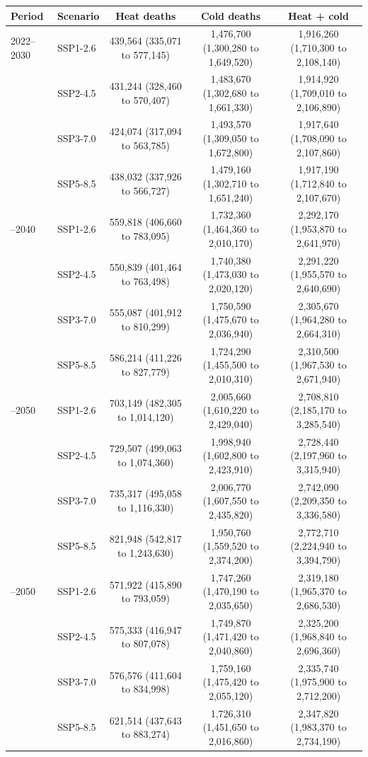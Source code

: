 \begin{tabular}{llccc}
\toprule
Period & Scenario & Heat deaths & Cold deaths & Heat + cold \\
\midrule
2022--2030 & SSP1-2.6 & 439,564 (335,071 to 577,145) & 1,476,700 (1,300,280 to 1,649,520) & 1,916,260 (1,710,300 to 2,108,140) \\
 & SSP2-4.5 & 431,244 (328,460 to 570,407) & 1,483,670 (1,302,680 to 1,661,330) & 1,914,920 (1,709,010 to 2,106,890) \\
 & SSP3-7.0 & 424,074 (317,094 to 563,785) & 1,493,570 (1,309,050 to 1,672,800) & 1,917,640 (1,708,090 to 2,107,860) \\
 & SSP5-8.5 & 438,032 (337,926 to 566,727) & 1,479,160 (1,302,710 to 1,651,240) & 1,917,190 (1,712,840 to 2,107,670) \\
\addlinespace
2031--2040 & SSP1-2.6 & 559,818 (406,660 to 783,095) & 1,732,360 (1,464,360 to 2,010,170) & 2,292,170 (1,953,870 to 2,641,970) \\
 & SSP2-4.5 & 550,839 (401,464 to 763,498) & 1,740,380 (1,473,030 to 2,020,120) & 2,291,220 (1,955,570 to 2,640,690) \\
 & SSP3-7.0 & 555,087 (401,912 to 810,299) & 1,750,590 (1,475,670 to 2,036,940) & 2,305,670 (1,964,280 to 2,664,310) \\
 & SSP5-8.5 & 586,214 (411,226 to 827,779) & 1,724,290 (1,455,500 to 2,010,310) & 2,310,500 (1,967,530 to 2,671,940) \\
\addlinespace
2041--2050 & SSP1-2.6 & 703,149 (482,305 to 1,014,120) & 2,005,660 (1,610,220 to 2,429,040) & 2,708,810 (2,185,170 to 3,285,540) \\
 & SSP2-4.5 & 729,507 (499,063 to 1,074,360) & 1,998,940 (1,602,800 to 2,423,910) & 2,728,440 (2,197,960 to 3,315,940) \\
 & SSP3-7.0 & 735,317 (495,058 to 1,116,330) & 2,006,770 (1,607,550 to 2,435,820) & 2,742,090 (2,209,350 to 3,336,580) \\
 & SSP5-8.5 & 821,948 (542,817 to 1,243,630) & 1,950,760 (1,559,520 to 2,374,200) & 2,772,710 (2,224,940 to 3,394,790) \\
\addlinespace
2022--2050 & SSP1-2.6 & 571,922 (415,890 to 793,059) & 1,747,260 (1,470,190 to 2,035,650) & 2,319,180 (1,965,370 to 2,686,530) \\
 & SSP2-4.5 & 575,333 (416,947 to 807,078) & 1,749,870 (1,471,420 to 2,040,860) & 2,325,200 (1,968,840 to 2,696,360) \\
 & SSP3-7.0 & 576,576 (411,604 to 834,998) & 1,759,160 (1,475,420 to 2,055,120) & 2,335,740 (1,975,900 to 2,712,200) \\
 & SSP5-8.5 & 621,514 (437,643 to 883,274) & 1,726,310 (1,451,650 to 2,016,860) & 2,347,820 (1,983,370 to 2,734,190) \\
\bottomrule
\end{tabular}
